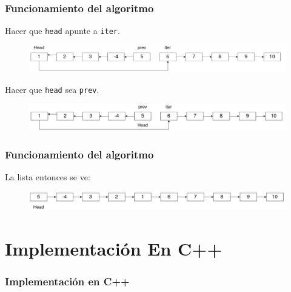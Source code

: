 \documentclass[17pt, t, lualatex]{beamer}
\newcommand{\cppinline}[1]{\lstinline[style=cppstyle]!#1!}
\begin{document}
\begin{frame}
  \frametitle{Funcionamiento del algoritmo}

  Hacer que \cppinline{head} apunte a \cppinline{iter}.

  \begin{figure}[h]
    \centering
    \includegraphics[width=\textwidth]{img/fig22.png}
  \end{figure}

  Hacer que \cppinline{head} sea \cppinline{prev}.

  \begin{figure}[h]
    \centering
    \includegraphics[width=\textwidth]{img/fig23.png}
  \end{figure}

\end{frame}

\begin{frame}
  \frametitle{Funcionamiento del algoritmo}

  La lista entonces se ve:

  \begin{figure}[h]
    \centering
    \includegraphics[width=\textwidth]{img/fig24.png}
  \end{figure}



\end{frame}



\section{Implementación En C++}

\insertsectionpage

\begin{frame}
  \frametitle{Implementación en C++}

 \scalebox{0.8}{}

\end{frame}
\end{document}
